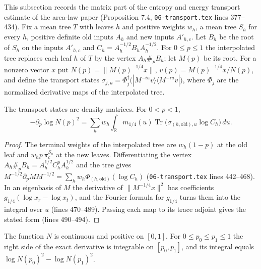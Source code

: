 This subsection records the matrix part of the entropy and energy transport
estimate of the area-law paper (Proposition 7.4, \texttt{06-transport.tex}
lines 377--434). Fix a mean tree $T$ with leaves $h$ and positive weights
$w_h$, a mean tree $S_h$ for every $h$, positive definite old inputs $A_h$ and
new inputs $A'_{h,c}$. Let $B_h$ be the root of $S_h$ on the inputs $A'_{h,c}$
and $C_h=A_h^{-1/2}B_hA_h^{-1/2}$. For $0\le p\le1$ the interpolated tree
replaces each leaf $h$ of $T$ by the vertex $A_h\#_pB_h$; let $M(p)$ be its
root. For a nonzero vector $x$ put $N(p)=\|M(p)^{-1/4}x\|$,
$v(p)=M(p)^{-1/4}x/N(p)$, and define the transport states
$\sigma_{j,u}=\Phi_j^\dagger\bigl(|M^{-iu}v\rangle\langle M^{-iu}v|\bigr)$, where
$\Phi_j$ are the normalized derivative maps of the interpolated tree.

\begin{lemma}\label{lem:transport_exact_derivative}
    \leanok
    The transport states are density matrices. For $0<p<1$,
    \[
      -\partial_p\log N(p)^2=\sum_hw_h\int_{\mathbb R}m_{1/4}(u)
      \operatorname{Tr}\bigl(\sigma_{(h,\mathrm{old}),u}\log C_h\bigr)\,du .
    \]
\end{lemma}

\begin{proof}\leanok
    The terminal weights of the interpolated tree are $w_h(1-p)$ at the old leaf
    and $w_hp\,\pi_c^{S_h}$ at the new leaves. Differentiating the vertex
    $A_h\#_pB_h=A_h^{1/2}C_h^pA_h^{1/2}$ and the tree gives
    $M^{-1/2}\partial_pMM^{-1/2}=\sum_hw_h\Phi_{(h,\mathrm{old})}(\log C_h)$
    (\texttt{06-transport.tex} lines 442--468). In an eigenbasis of $M$ the
    derivative of $\|M^{-1/4}x\|^2$ has coefficients
    $g_{1/4}(\log x_r-\log x_t)$, and the Fourier formula for $g_{1/4}$ turns
    them into the integral over $u$ (lines 470--489). Passing each map to its
    trace adjoint gives the stated form (lines 490--494).
\end{proof}

\begin{lemma}\label{lem:transport_integrated_derivative}
    \leanok
    The function $N$ is continuous and positive on $[0,1]$. For
    $0\le p_0\le p_1\le1$ the right side of the exact derivative is integrable
    on $[p_0,p_1]$, and its integral equals
    $\log N(p_0)^2-\log N(p_1)^2$.
\end{lemma}

